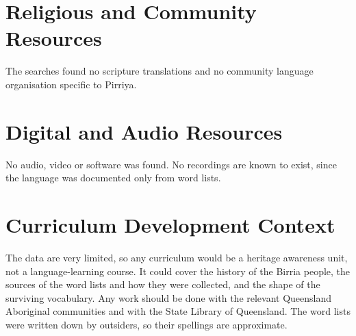 \documentclass[12pt]{article}
\begin{document}
\section{Religious and Community Resources}
The searches found no scripture translations and no community language organisation specific to Pirriya.

\section{Digital and Audio Resources}
No audio, video or software was found. No recordings are known to exist, since the language was documented only from word lists.

\section{Curriculum Development Context}
The data are very limited, so any curriculum would be a heritage awareness unit, not a language-learning course. It could cover the history of the Birria people, the sources of the word lists and how they were collected, and the shape of the surviving vocabulary. Any work should be done with the relevant Queensland Aboriginal communities and with the State Library of Queensland. The word lists were written down by outsiders, so their spellings are approximate.
\end{document}
